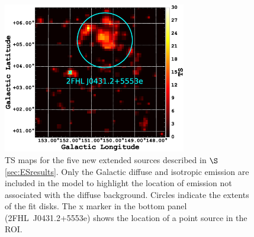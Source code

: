\begin{figure}[!ht]
\begin{centering}
		\includegraphics[width=8cm]{Figures/l145_b0_ES_1_residTSmap_2FHL_zoom.eps}
		\caption{TS maps for the five new extended sources described in $\S$ \ref{sec:ESresults}.  Only the Galactic diffuse and isotropic emission are included in the model to highlight the location of emission not associated with the diffuse background. Circles indicate the extents of the fit disks. {The x marker in the bottom panel (2FHL~J0431.2+5553e) shows the location of a point source in the ROI.}
			\label{fig:6ES}}
		
	\end{centering}
\end{figure}




